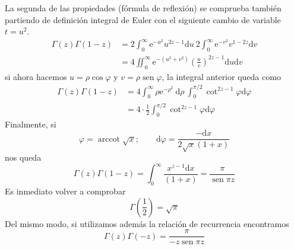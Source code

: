 \documentclass[spanish,notitlepage,letterpaper,12pt]{article}
\begin{document}
La segunda de las propiedades (f\'{o}rmula de reflexi\'{o}n) se comprueba
tambi\'{e}n partiendo de definici\'{o}n integral de Euler con el siguiente
cambio de variable $t=u^{2}$.
\begin{align*}
\Gamma\left(  z\right)  \Gamma\left(  1-z\right)   & =2\int_{0}^{\infty
}\mathrm{e}^{-u^{2}}u^{2z-1}\mathrm{d}u\ 2\int_{0}^{\infty}\mathrm{e}^{-v^{2}%
}v^{1-2z}\mathrm{d}v\\
& =4\iint_{0}^{\infty}\mathrm{e}^{-\left(  u^{2}+v^{2}\right)  }\left(  \frac
uv\right)  ^{2z-1}\mathrm{d}u\mathrm{d}v
\end{align*}
si ahora hacemos $u=\rho\cos\varphi$ y $v=\rho\operatorname*{sen}\varphi$, la
integral anterior queda como
\begin{align*}
\Gamma\left(  z\right)  \Gamma\left(  1-z\right)   & =4\int_{0}^{\infty}%
\rho\mathrm{e}^{-\rho^{2}}\ \mathrm{d}\rho\ \int_{0}^{\pi/2}\cot^{2z-1}%
\varphi\mathrm{d}\varphi\\
& =4\cdot\frac12\int_{0}^{\pi/2}\cot^{2z-1}\varphi\mathrm{d}\varphi
\end{align*}
Finalmente, si
\[
\varphi=\operatorname*{arccot}\sqrt{x};\qquad\mathrm{d}\varphi=\frac
{-\mathrm{d}x}{2\sqrt{x}\left(  1+x\right)  }
\]
nos queda
\[
\Gamma\left(  z\right)  \Gamma\left(  1-z\right)  =\int_{0}^{\infty}%
\frac{x^{z-1}\mathrm{d}x}{\left(  1+x\right)  }=\frac\pi{\operatorname*{sen}%
\pi z}
\]
Es inmediato volver a comprobar
\[
\Gamma\left(  \frac12\right)  =\sqrt{\pi}
\]
Del mismo modo, si utilizamos adem\'{a}s la relaci\'{o}n de recurrencia
encontramos
\[
\Gamma\left(  z\right)  \Gamma\left(  -z\right)  =\frac\pi
{-z\operatorname*{sen}\pi z}
\]
\end{document}
